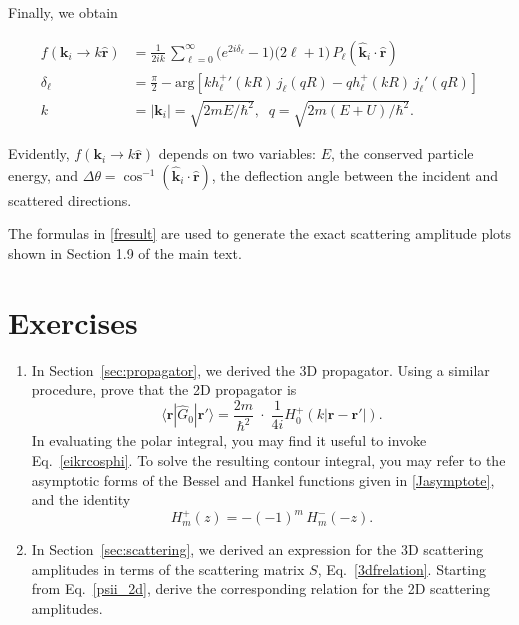 \documentclass[pra,12pt]{revtex4-2}
\begin{document}
\clearpage
Finally, we obtain
\begin{framed}
\begin{equation}
  \begin{aligned}f(\mathbf{k}_i \rightarrow k\hat{\mathbf{r}}) &= \frac{1}{2ik}\, \sum_{\ell =0}^\infty \big(e^{2i\delta_\ell} - 1\big) \big(2\ell+1\big)\, P_{\ell}(\hat{\mathbf{k}}_i\cdot \hat{\mathbf{r}}) \\ \delta_\ell &= \frac{\pi}{2} - \mathrm{arg}\!\left[k{h_\ell^+}'(kR) \, j_\ell(qR) - qh_\ell^+(kR)\, j_\ell'(qR)\right] \\ k &= |\mathbf{k}_i| = \sqrt{2mE/\hbar^2}, \;\; q = \sqrt{2m(E+U)/\hbar^2}.\end{aligned}
  \label{fresult}
\end{equation}
\end{framed}
\noindent
Evidently, $f(\mathbf{k}_i \rightarrow k\hat{\mathbf{r}})$ depends on
two variables: $E$, the conserved particle energy, and $\Delta \theta
= \cos^{-1}(\hat{\mathbf{k}}_i\cdot \hat{\mathbf{r}})$, the deflection
angle between the incident and scattered directions.

The formulas in \eqref{fresult} are used to generate the exact
scattering amplitude plots shown in Section 1.9 of the main text.


\section*{Exercises}

\begin{enumerate}
\item \label{ex:2dpropagator}
  In Section~\ref{sec:propagator}, we derived the 3D propagator.
  Using a similar procedure, prove that the 2D propagator is
  \begin{equation}
    \langle\mathbf{r}|\hat{G}_0|\mathbf{r}'\rangle = \frac{2m}{\hbar^2}\;
    \cdot\; \frac{1}{4i} H^+_0(k|\mathbf{r}-\mathbf{r'}|).
  \end{equation}
  In evaluating the polar integral, you may find it useful to invoke
  Eq.~\eqref{eikrcosphi}.  To solve the resulting contour integral,
  you may refer to the asymptotic forms of the Bessel and Hankel
  functions given in \eqref{Jasymptote}, and the identity
  \begin{equation}
    H_m^+(z) = - (-1)^m \, H_m^-(-z).
  \end{equation}

\item \label{ex:2dscattering} In Section~\ref{sec:scattering}, we
  derived an expression for the 3D scattering amplitudes in terms of
  the scattering matrix $S$, Eq.~\eqref{3dfrelation}.  Starting from
  Eq.~\eqref{psii_2d}, derive the corresponding relation for the 2D
  scattering amplitudes.

\end{enumerate}
\end{document}
